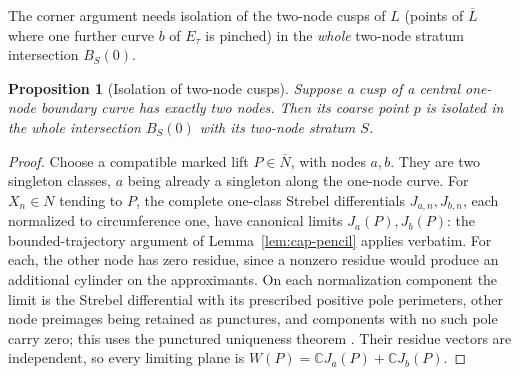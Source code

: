 \documentclass[12pt]{article}
\newcommand{\cl}[1]{\overline{#1}}
\newtheorem{proposition}[theorem]{Proposition}
\theoremstyle{remark}
\begin{document}
The corner argument needs isolation of the two-node cusps of \(L\)
(points of \(\cl L\) where one further curve \(b\) of \(E_\tau\) is
pinched) in the \emph{whole} two-node stratum intersection \(B_S(0)\).

\begin{proposition}[Isolation of two-node cusps]\label{prop:two-corner}
Suppose a cusp of a central one-node boundary curve has exactly
two nodes. Then its coarse point \(p\) is isolated in the
whole intersection \(B_S(0)\) with its two-node stratum \(S\).
\end{proposition}
\begin{proof}
Choose a compatible marked lift \(P\in\cl N\), with nodes
\(a,b\). They are two singleton classes, \(a\) being already a
singleton along the one-node curve. For \(X_n\in N\) tending
to \(P\), the complete one-class Strebel differentials
\(J_{a,n},J_{b,n}\), each normalized to circumference one,
have canonical limits \(J_a(P),J_b(P)\): the bounded-trajectory
argument of Lemma~\ref{lem:cap-pencil} applies verbatim. For each,
the other node has zero residue, since a nonzero residue would produce
an additional cylinder on the approximants. On each
normalization component the limit is the Strebel differential
with its prescribed positive pole perimeters, other node
preimages being retained as punctures, and components with no such
pole carry zero; this uses the punctured uniqueness theorem
\cite[Theorem 2, Remark 3.8]{Zvonkine}.
Their residue vectors are independent, so every limiting
plane is \(W(P)=\mathbb C J_a(P)+\mathbb C J_b(P)\).


\end{proof}
\end{document}
